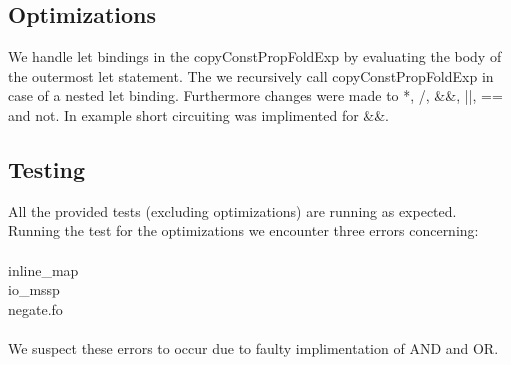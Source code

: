 \documentclass[12pt]{article}
\numberwithin{listing}{section}
\begin{document}
\subsection*{Optimizations}
We handle let bindings in the copyConstPropFoldExp by evaluating the body of the outermost let statement. The we recursively call copyConstPropFoldExp in case of a nested let binding. Furthermore changes were made to *, /, \&\&, ||, == and not. In example short circuiting was implimented for \&\&.

\subsection*{Testing}
All the provided tests (excluding optimizations) are running as expected. Running the test for the optimizations we encounter three errors concerning:
\\\\ inline\_map \\ io\_mssp \\ negate.fo \\\\
We suspect these errors to occur due to faulty implimentation of AND and OR.




%
\end{document}
